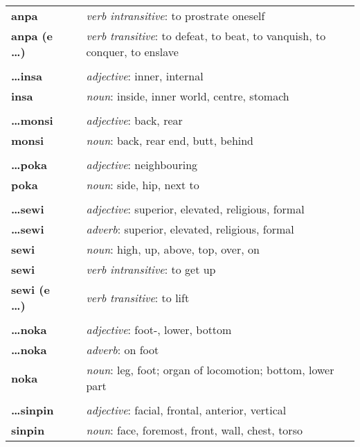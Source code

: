 \begin{supertabular}{p{2,5cm}|ll}
\textbf{anpa} && \textit{verb intransitive}: to prostrate oneself \\ %
\textbf{anpa (e \dots)} && \textit{verb transitive}: to defeat, to beat, to vanquish, to conquer, to enslave \\ %
 && \\ %
\textbf{\dots insa} && \textit{adjective}: inner, internal \\ %
\textbf{insa} && \textit{noun}: inside, inner world, centre, stomach \\ %
 && \\ %
\textbf{\dots monsi} && \textit{adjective}: back, rear \\ %
\textbf{monsi} && \textit{noun}: back, rear end, butt, behind \\ %
 && \\ %
\textbf{\dots poka} && \textit{adjective}: neighbouring \\ %
\textbf{poka} && \textit{noun}: side, hip, next to \\ %
 && \\ %
\textbf{\dots sewi} && \textit{adjective}: superior, elevated, religious, formal \\ %
\textbf{\dots sewi} && \textit{adverb}: superior, elevated, religious, formal \\ %
\textbf{sewi} && \textit{noun}: high, up, above, top, over, on \\ %
\textbf{sewi} && \textit{verb intransitive}: to get up \\ %
\textbf{sewi (e \dots)} && \textit{verb transitive}: to lift \\ %
 && \\ %
\textbf{\dots noka} && \textit{adjective}: foot-, lower, bottom \\  %
\textbf{ \dots noka } && \textit{adverb}: on foot \\  %
\textbf{noka} && \textit{noun}: leg, foot; organ of locomotion; bottom, lower part \\ %
 && \\ %
\textbf{\dots sinpin} && \textit{adjective}: facial, frontal, anterior, vertical \\ %
\textbf{sinpin} && \textit{noun}: face, foremost, front, wall, chest, torso \\ %
\end{supertabular} \\
%
\newpage{}
